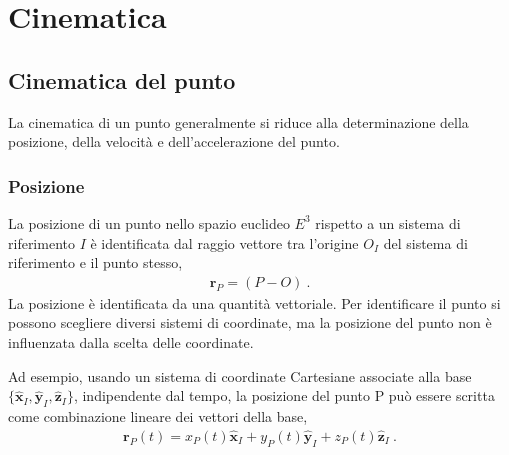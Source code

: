 \documentclass[letterpaper,10pt,english]{jupyterBook}
\begin{document}
\chapter{Cinematica}
\label{\detokenize{ch/kinematics:cinematica}}\label{\detokenize{ch/kinematics:classical-mechanics-kinematics}}\label{\detokenize{ch/kinematics::doc}}


\sphinxstepscope


\section{Cinematica del punto}
\label{\detokenize{ch/kinematics-point:cinematica-del-punto}}\label{\detokenize{ch/kinematics-point:classical-mechanics-kinematics-point}}\label{\detokenize{ch/kinematics-point::doc}}
\sphinxAtStartPar
La cinematica di un punto generalmente si riduce alla determinazione della posizione, della velocità e dell’accelerazione del punto.


\subsection{Posizione}
\label{\detokenize{ch/kinematics-point:posizione}}
\sphinxAtStartPar
La posizione di un punto nello spazio euclideo \(E^3\) rispetto a un sistema di riferimento \(I\) è identificata dal raggio vettore tra l’origine \(O_I\) del sistema di riferimento e il punto stesso,
\begin{equation*}
\begin{split}\mathbf{r}_P = (P - O) \ .\end{split}
\end{equation*}
\sphinxAtStartPar
La posizione è identificata da una quantità vettoriale. Per identificare il punto si possono scegliere diversi sistemi di coordinate, ma la posizione del punto non è influenzata dalla scelta delle coordinate.

\sphinxAtStartPar
Ad esempio, usando un sistema di coordinate Cartesiane associate alla base \(\{\hat{\mathbf{x}}_I, \hat{\mathbf{y}}_I, \hat{\mathbf{z}}_I \}\), indipendente dal tempo, la posizione del punto P può essere scritta come combinazione lineare dei vettori della base,
\begin{equation*}
\begin{split}\mathbf{r}_P(t) = x_P(t) \hat{\mathbf{x}}_I + y_P(t) \hat{\mathbf{y}}_I + z_P(t) \hat{\mathbf{z}}_I \ .\end{split}
\end{equation*}
\end{document}
